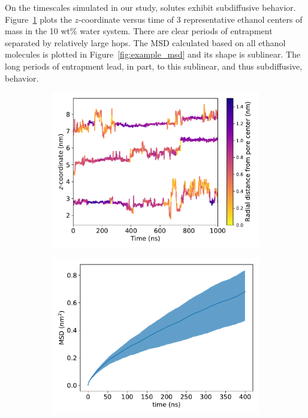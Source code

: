 \documentclass[journal=jpcbfk,manuscript=article]{achemso}
\begin{document}
  On the timescales simulated in our study, solutes exhibit subdiffusive
  behavior. Figure~\ref{fig:example_ztraces} plots the $z$-coordinate versus
  time of 3 representative ethanol centers of mass in the 10 wt\% water system.
  There are clear periods of entrapment separated by relatively large hops.
  The MSD calculated based on all ethanol molecules is plotted in 
  Figure~\ref{fig:example_msd} and its shape is sublinear. The long periods
  of entrapment lead, in part, to this sublinear, and thus subdiffusive, behavior.
  
  \begin{figure}[!htb]
  \centering
  \begin{subfigure}{0.49\textwidth}
  \includegraphics[width=\linewidth]{colorful_example_ztraces.pdf}
  \caption{}\label{fig:example_ztraces}
  \end{subfigure}
  \begin{subfigure}{0.49\textwidth}
  \includegraphics[width=\linewidth]{example_msd.pdf}

\end{subfigure}
\end{figure}
\end{document}
